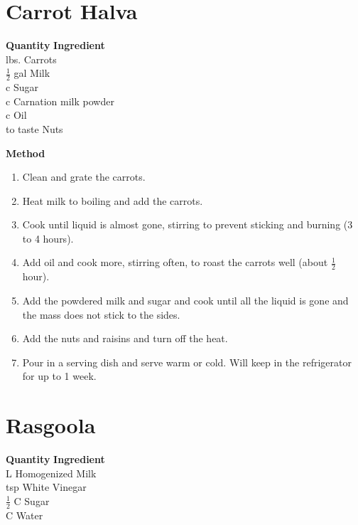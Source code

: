 \section{Carrot Halva}

\begin{tabbing}
\hspace{1.0cm}  \={\bf Quantity}   \hspace{3.0cm} \={\bf Ingredient}\\

 lbs. \>Carrots\\
\>$\frac{1}{2}$ gal \>Milk\\
 c \>Sugar\\
 c \>Carnation milk powder\\
 c \>Oil\\
\>to taste \>Nuts \\
\end{tabbing}

{\bf Method}
\begin{enumerate}
\item Clean and grate the carrots.
\item Heat milk to boiling and add the carrots.
\item Cook until liquid is almost gone, stirring to prevent sticking and
burning (3 to 4 hours).
\item Add oil and cook more, stirring often, to roast the carrots well (about
$\frac{1}{2}$ hour).
\item Add the powdered milk and sugar and cook until all the liquid is gone
and the mass does not stick to the sides.
\item Add the nuts and raisins and turn off the heat.
\item Pour in a serving dish and serve warm or cold.  Will keep in the
refrigerator for up to 1 week.
\end{enumerate}


\section{Rasgoola}

\begin{tabbing}
\hspace{1.0cm}  \={\bf Quantity}   \hspace{3.0cm} \={\bf Ingredient}\\
 L   	\> Homogenized Milk  \\
 tsp  	\> White Vinegar\\
$\frac{1}{2}$ C \> Sugar\\
 C  	\>  Water\\
\end{tabbing}

